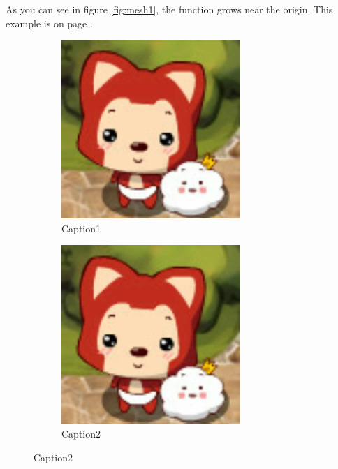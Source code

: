 \documentclass[12pt, a4paper]{article}
\begin{document}
As you can see in figure \ref{fig:mesh1}, the function grows near the origin.
This example is on page \pageref{fig:mesh1}.

\begin{figure}[H]
    \centering
    \begin{subfigure}{0.4\textwidth}
        \includegraphics[width=\linewidth]{favicon.png}
        \caption{Caption1}
        \label{fig:subimg1}
    \end{subfigure}
    \begin{subfigure}{0.4\textwidth}
        \includegraphics[width=\linewidth]{favicon.png}
        \caption{Caption2}
        \label{fig:subimg2}
    \end{subfigure}


\end{figure}
\end{document}
